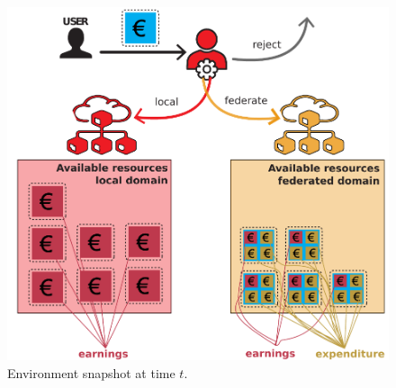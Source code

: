 \documentclass[aspectratio=169]{beamer}
\begin{document}
\begin{frame}
\begin{minipage}{.45\textwidth}
    \end{minipage}
    \begin{minipage}{.5\textwidth}
    \begin{figure}
        \centering
        \includegraphics[width=.9\textwidth]{img/available}
        \caption{Environment snapshot at time $t$.}
        \label{fig:earnings-actions}
    \end{figure}
    \end{minipage}
\end{frame}
\end{document}
